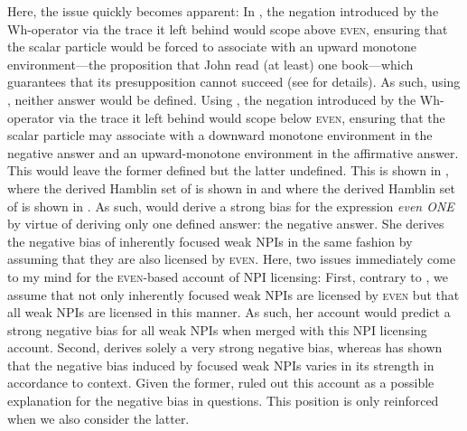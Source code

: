 Here, the issue quickly becomes apparent: In , the negation introduced by the Wh-operator via the trace it left behind would scope above {\scshape even}, ensuring that the scalar particle would be forced to associate with an upward monotone environment---the proposition that John read (at least) one book---which guarantees that its presupposition cannot succeed (see  for details). As such, using , neither answer would be defined. Using , the negation introduced by the Wh-operator via the trace it left behind would scope below {\scshape even}, ensuring that the scalar particle may associate with a downward monotone environment in the negative answer and an upward-monotone environment in the affirmative answer. This would leave the former defined but the latter undefined. This is shown in , where the derived Hamblin set of  is shown in  and where the derived Hamblin set of  is shown in .
\pex\label{ex:guerzoni-even-lf-hamblin}
\a {}
\a {}
\xe
As such, \textcite{Guerzoni2003,Guerzoni2004} would derive a strong bias for the expression \textit{even \MakeUppercase{one}} by virtue of deriving only one defined answer: the negative answer. She derives the negative bias of inherently focused weak NPIs in the same fashion by assuming that they are also licensed by {\scshape even}. Here, two issues immediately come to my mind for the {\scshape even}-based account of NPI licensing: First, contrary to \textcite{Guerzoni2003,Guerzoni2004}, we assume that not only inherently focused weak NPIs are licensed by {\scshape even} but that all weak NPIs are licensed in this manner. As such, her account would predict a strong negative bias for all weak NPIs when merged with this NPI licensing account. Second, \textcite{Guerzoni2003,Guerzoni2004} derives solely a very strong negative bias, whereas  has shown that the negative bias induced by focused weak NPIs varies in its strength in accordance to context. Given the former, \textcite{Crnic2014-dogma,Crnic2014-nm} ruled out this account as a possible explanation for the negative bias in questions. This position is only reinforced when we also consider the latter.

